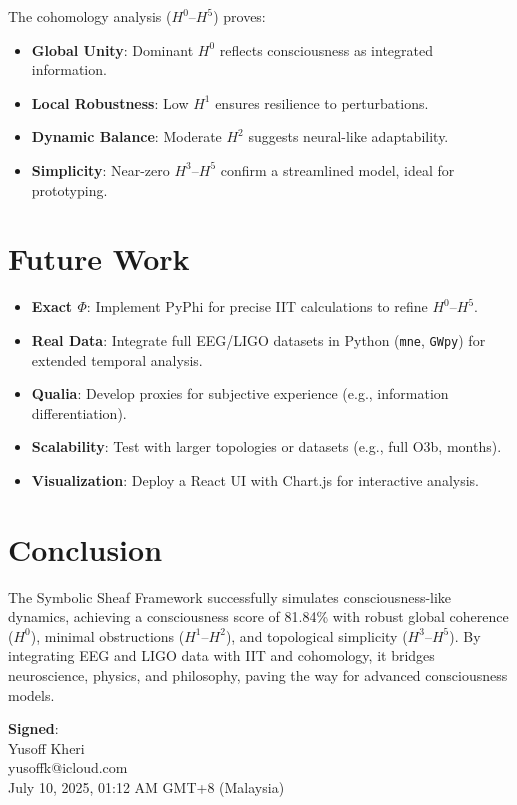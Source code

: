 \documentclass[12pt]{article}
\begin{document}
The cohomology analysis ($H^0$--$H^5$) proves:
\begin{itemize}
    \item \textbf{Global Unity}: Dominant $H^0$ reflects consciousness as integrated information.
    \item \textbf{Local Robustness}: Low $H^1$ ensures resilience to perturbations.
    \item \textbf{Dynamic Balance}: Moderate $H^2$ suggests neural-like adaptability.
    \item \textbf{Simplicity}: Near-zero $H^3$--$H^5$ confirm a streamlined model, ideal for prototyping.
\end{itemize}

\section*{Future Work}
\begin{itemize}
    \item \textbf{Exact $\Phi$}: Implement PyPhi for precise IIT calculations to refine $H^0$--$H^5$.
    \item \textbf{Real Data}: Integrate full EEG/LIGO datasets in Python (\texttt{mne}, \texttt{GWpy}) for extended temporal analysis.
    \item \textbf{Qualia}: Develop proxies for subjective experience (e.g., information differentiation).
    \item \textbf{Scalability}: Test with larger topologies or datasets (e.g., full O3b, months).
    \item \textbf{Visualization}: Deploy a React UI with Chart.js for interactive analysis.
\end{itemize}

\section*{Conclusion}
The Symbolic Sheaf Framework successfully simulates consciousness-like dynamics, achieving a consciousness score of 81.84\% with robust global coherence ($H^0$), minimal obstructions ($H^1$--$H^2$), and topological simplicity ($H^3$--$H^5$). By integrating EEG and LIGO data with IIT and cohomology, it bridges neuroscience, physics, and philosophy, paving the way for advanced consciousness models.

\begin{flushright}
    \textbf{Signed}: \\
    Yusoff Kheri \\
    yusoffk@icloud.com \\
    July 10, 2025, 01:12 AM GMT+8 (Malaysia)
\end{flushright}
\end{document}
